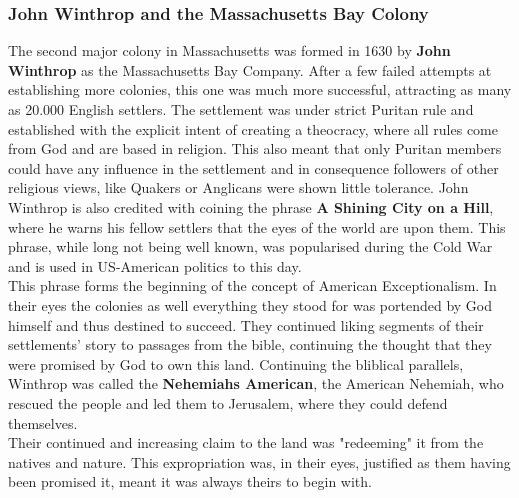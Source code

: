 \documentclass{article}
\begin{document}
	\subsubsection{John Winthrop and the Massachusetts Bay Colony}
	The second major colony in Massachusetts was formed in 1630 by \textbf{John Winthrop} as the Massachusetts Bay Company. After a few failed attempts at establishing more colonies, this one was much more successful, attracting as many as 20.000 English settlers. The settlement was under strict Puritan rule and established with the explicit intent of creating a theocracy, where all rules come from God and are based in religion. This also meant that only Puritan members could have any influence in the settlement and in consequence followers of other religious views, like Quakers or Anglicans were shown little tolerance. John Winthrop is also credited with coining the phrase \textbf{A Shining City on a Hill}, where he warns his fellow settlers that the eyes of the world are upon them. This phrase, while long not being well known, was popularised during the Cold War and is used in US-American politics to this day. \\
	This phrase forms the beginning of the concept of American Exceptionalism. In their eyes the colonies as well everything they stood for was portended by God himself and thus destined to succeed. They continued liking segments of their settlements' story to passages from the bible, continuing the thought that they were promised by God to own this land. Continuing the bliblical parallels, Winthrop was called the \textbf{Nehemiahs American}, the American Nehemiah, who rescued the people and led them to Jerusalem, where they could defend themselves. \\
	Their continued and increasing claim to the land was "redeeming" it from the natives and nature. This expropriation was, in their eyes, justified as them having been promised it, meant it was always theirs to begin with. \\
	
	
\end{document}
